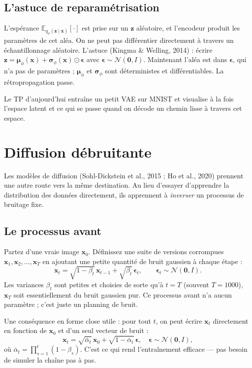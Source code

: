 \subsection{L'astuce de reparamétrisation}

L'espérance $\mathbb{E}_{q_\phi(\bm{z} \mid \bm{x})}[\cdot]$ est prise sur un $\bm{z}$ aléatoire, et l'encodeur produit les paramètres de cet aléa. On ne peut pas différentier directement à travers un échantillonnage aléatoire. L'astuce (Kingma \& Welling, 2014) : écrire $\bm{z} = \bm{\mu}_\phi(\bm{x}) + \bm{\sigma}_\phi(\bm{x}) \odot \bm{\epsilon}$ avec $\bm{\epsilon} \sim \mathcal{N}(\bm{0}, I)$. Maintenant l'aléa est dans $\bm{\epsilon}$, qui n'a pas de paramètres ; $\bm{\mu}_\phi$ et $\bm{\sigma}_\phi$ sont déterministes et différentiables. La rétropropagation passe.

Le TP d'aujourd'hui entraîne un petit VAE sur MNIST et visualise à la fois l'espace latent et ce qui se passe quand on décode un chemin lisse à travers cet espace.

\section{Diffusion débruitante}

Les modèles de diffusion (Sohl-Dickstein et al., 2015 ; Ho et al., 2020) prennent une autre route vers la même destination. Au lieu d'essayer d'apprendre la distribution des données directement, ils apprennent à \emph{inverser} un processus de bruitage fixe.

\subsection{Le processus avant}

Partez d'une vraie image $\bm{x}_0$. Définissez une suite de versions corrompues $\bm{x}_1, \bm{x}_2, \ldots, \bm{x}_T$ en ajoutant une petite quantité de bruit gaussien à chaque étape :
\[
\bm{x}_t = \sqrt{1 - \beta_t} \, \bm{x}_{t-1} + \sqrt{\beta_t} \, \bm{\epsilon}_t, \qquad \bm{\epsilon}_t \sim \mathcal{N}(\bm{0}, I).
\]
Les variances $\beta_t$ sont petites et choisies de sorte qu'à $t = T$ (souvent $T = 1000$), $\bm{x}_T$ soit essentiellement du bruit gaussien pur. Ce processus avant n'a aucun paramètre ; c'est juste un planning de bruit.

Une conséquence en forme close utile : pour tout $t$, on peut écrire $\bm{x}_t$ directement en fonction de $\bm{x}_0$ et d'un seul vecteur de bruit :
\[
\bm{x}_t = \sqrt{\bar{\alpha}_t} \, \bm{x}_0 + \sqrt{1 - \bar{\alpha}_t} \, \bm{\epsilon}, \quad \bm{\epsilon} \sim \mathcal{N}(\bm{0}, I),
\]
où $\bar{\alpha}_t = \prod_{s=1}^t (1 - \beta_s)$. C'est ce qui rend l'entraînement efficace --- pas besoin de simuler la chaîne pas à pas.

